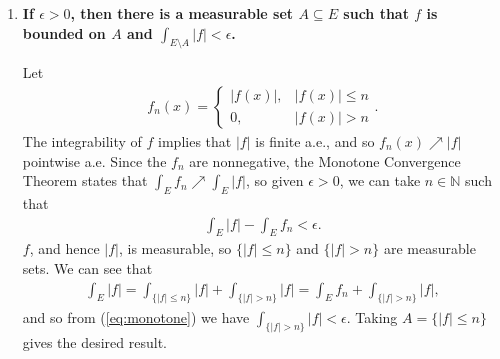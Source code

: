 \documentclass[a4paper,12pt]{article}
\begin{document}
\begin{enumerate}
\begin{enumerate}[label=(\alph*)]
            \item
                \boldmath\textbf{If $\epsilon > 0$, then there is a measurable set $A \subseteq E$ such that $f$ is bounded on $A$ and $\int_{E \setminus A} |f| < \epsilon$.
                }\unboldmath \par
                Let
                \begin{align*}
                    f_n(x) = \begin{cases}
                        |f(x)|, &|f(x)| \leq n \\
                        0, &|f(x)| > n
                    \end{cases}.
                \end{align*}
                The integrability of $f$ implies that $|f|$ is finite a.e., and so $f_n(x) \nearrow |f|$ pointwise a.e. Since the $f_n$ are nonnegative, the Monotone Convergence Theorem states that $\int_E f_n \nearrow \int_E |f|$, so given $\epsilon > 0$, we can take $n \in \mathbb{N}$ such that
                \begin{align} \label{eq:monotone}
                    \int_E |f| - \int_E f_n < \epsilon.
                \end{align}
                $f$, and hence $|f|$, is measurable, so $\{ |f| \leq n \}$ and $\{ |f| > n \}$ are measurable sets. We can see that
                \begin{align*}
                    \int_E |f| = \int_{\{ |f| \leq n \}} |f| + \int_{\{ |f| > n \}} |f| = \int_E f_n + \int_{\{ |f| > n \}} |f|,
                \end{align*}
                and so from (\ref{eq:monotone}) we have $\int_{\{ |f| > n \}} |f| < \epsilon$. Taking $A = \{ |f| \leq n \}$ gives the desired result.
        \end{enumerate}


\end{enumerate}
\end{document}
